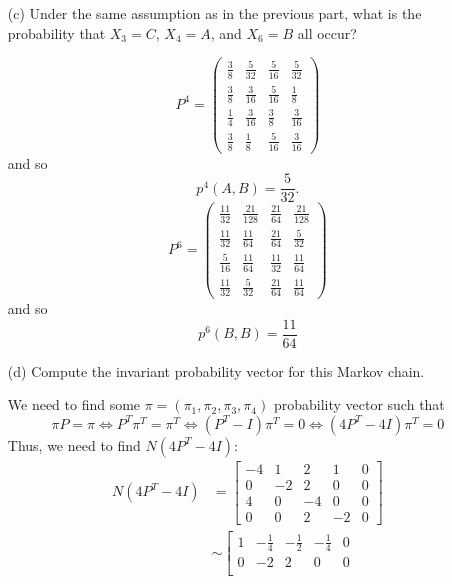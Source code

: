 \documentclass[11pt]{article}
\begin{document}
\begin{problem}
\begin{enumerate}
\begin{solution}
\end{solution}
    \item[(c)] Under the same assumption as in the previous part, what is the probability that \( X_3 = C \), \( X_4 = A \), and \( X_6 = B \) all occur?
\begin{solution}
    \[P^4 = 
\begin{pmatrix}
\frac{3}{8} & \frac{5}{32} & \frac{5}{16} & \frac{5}{32} \\
\frac{3}{8} & \frac{3}{16} & \frac{5}{16} & \frac{1}{8} \\
\frac{1}{4} & \frac{3}{16} & \frac{3}{8} & \frac{3}{16} \\
\frac{3}{8} & \frac{1}{8} & \frac{5}{16} & \frac{3}{16}
\end{pmatrix}
\]
and so 
\[\boxed{p^4(A, B) = \frac{5}{32}}.\]
\[P^6 = \begin{pmatrix}
\frac{11}{32} & \frac{21}{128} & \frac{21}{64} & \frac{21}{128} \\
\frac{11}{32} & \frac{11}{64} & \frac{21}{64} & \frac{5}{32} \\
\frac{5}{16} & \frac{11}{64} & \frac{11}{32} & \frac{11}{64} \\
\frac{11}{32} & \frac{5}{32} & \frac{21}{64} & \frac{11}{64}
\end{pmatrix}
\]
and so 
\[\boxed{p^6(B,B) = \frac{11}{64}}\]
\end{solution}
    \item[(d)] Compute the invariant probability vector for this Markov chain.
\begin{solution}
    We need to find some $\pi = (\pi_1, \pi_2, \pi_3, \pi_4)$ probability vector such that 
    \[\pi P  = \pi \iff P^T\pi^T = \pi^T \iff (P^T - I)\pi^T = 0\iff (4P^T - 4I)\pi^T = 0\] Thus, we need to find $N(4P^T - 4I):$
    \begin{align*}
        N(4P^T - 4I) &= 
        \left[\begin{array}{cccc|c}
            -4 & 1 & 2 & 1 & 0\\
            0 & -2 & 2 & 0 & 0 \\
            4 & 0 & -4 & 0 & 0\\
            0 & 0 & 2 & -2 & 0
        \end{array}\right]\\
        &\sim
        \left[\begin{array}{cccc|c}
            1 & -\frac{1}{4} & -\frac{1}{2} & -\frac{1}{4} & 0\\
            0 & -2 & 2 & 0 & 0 \\

\end{array}
\end{align*}
\end{solution}
\end{enumerate}
\end{problem}
\end{document}
